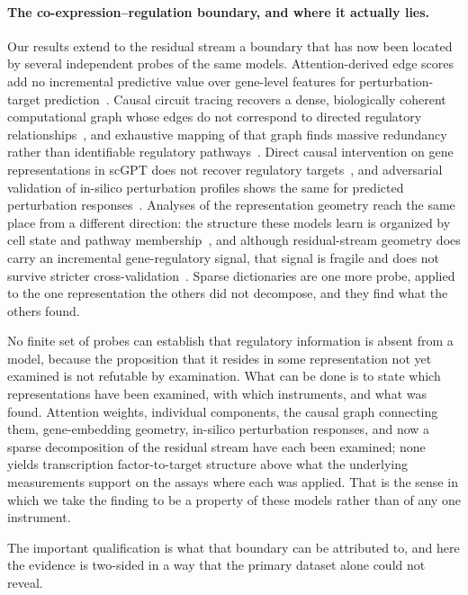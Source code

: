 \documentclass[onecolumn,11pt]{article}
\begin{document}
\paragraph{The co-expression--regulation boundary, and where it actually lies.}
Our results extend to the residual stream a boundary that has now been located by several
independent probes of the same models. Attention-derived edge scores add no incremental predictive
value over gene-level features for perturbation-target prediction~\cite{kendiukhov2025systematic}.
Causal circuit tracing recovers a dense, biologically coherent computational graph whose edges do
not correspond to directed regulatory relationships~\cite{kendiukhov2026circuittracing}, and
exhaustive mapping of that graph finds massive redundancy rather than identifiable regulatory
pathways~\cite{kendiukhov2026exhaustive}. Direct causal intervention on gene representations in
scGPT does not recover regulatory targets~\cite{kendiukhov2026causalintervention}, and adversarial
validation of in-silico perturbation profiles shows the same for predicted perturbation
responses~\cite{kendiukhov2026insilico}. Analyses of the representation geometry reach the same
place from a different direction: the structure these models learn is organized by cell state and
pathway membership~\cite{kendiukhov2026topology,kendiukhov2026celltypeprograms}, and although
residual-stream geometry does carry an incremental gene-regulatory signal, that signal is fragile
and does not survive stricter cross-validation~\cite{kendiukhov2026grsgeometry}. Sparse
dictionaries are one more probe, applied to the one representation the others did not decompose,
and they find what the others found.

No finite set of probes can establish that regulatory information is absent from a model, because
the proposition that it resides in some representation not yet examined is not refutable by
examination. What can be done is to state which representations have been examined, with which
instruments, and what was found. Attention weights, individual components, the causal graph
connecting them, gene-embedding geometry, in-silico perturbation responses, and now a sparse
decomposition of the residual stream have each been examined; none yields transcription
factor-to-target structure above what the underlying measurements support on the assays where each
was applied. That is the sense in
which we take the finding to be a property of these models rather than of any one instrument.

The important qualification is what that boundary can be attributed to, and here the evidence is
two-sided in a way that the primary dataset alone could not reveal.
\end{document}
